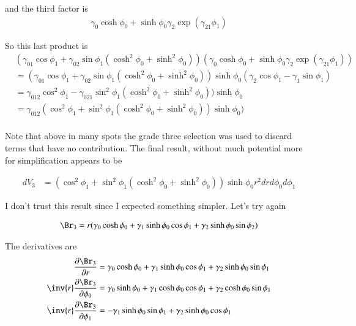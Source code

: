 \documentclass{article}
\begin{document}
and the third factor is
\begin{align*}
\gamma_0 \cosh \phi_0 + \sinh\phi_0 \gamma_{2} \exp( \gamma_{21} \phi_1 ) 
\end{align*}

So this last product is
\begin{align*}
&(\gamma_{01} \cos\phi_1 +\gamma_{02} \sin\phi_1 (\cosh^2 \phi_0 + \sinh^2 \phi_0) )
(\gamma_0 \cosh \phi_0 + \sinh\phi_0 \gamma_{2} \exp( \gamma_{21} \phi_1 ) ) \\
&=
(\gamma_{01} \cos\phi_1 +\gamma_{02} \sin\phi_1 (\cosh^2 \phi_0 + \sinh^2 \phi_0) ) \sinh\phi_0 (\gamma_{2} \cos \phi_1 -\gamma_{1} \sin\phi_1 ) \\
&=
 \gamma_{012} \cos^2\phi_1 
-\gamma_{021} \sin^2\phi_1 (\cosh^2 \phi_0 + \sinh^2 \phi_0) ) \sinh\phi_0  \\
&=
 \gamma_{012} (\cos^2\phi_1 +\sin^2\phi_1 (\cosh^2 \phi_0 + \sinh^2 \phi_0) ) \sinh\phi_0 ) \\
\end{align*}

Note that above in many spots the grade three selection was used to discard terms that have no contribution.  The final result, without much 
potential more for simplification appears to be

\begin{align*}
dV_3 &= (\cos^2\phi_1 +\sin^2\phi_1 (\cosh^2 \phi_0 + \sinh^2 \phi_0) ) \sinh\phi_0 r^2 dr d\phi_0 d\phi_1
\end{align*}

I don't trust this result since I expected something simpler.  Let's try again

\begin{align*}
\Br_3 &= r (\gamma_0 \cosh \phi_0 + \gamma_1 \sinh\phi_0 \cos\phi_1 + \gamma_2 \sinh\phi_0 \sin\phi_2 ) \\
\end{align*}

The derivatives are
\begin{align*}
\PD{r}{\Br_3} &= \gamma_0 \cosh \phi_0 + \gamma_1 \sinh\phi_0 \cos\phi_1 + \gamma_2 \sinh\phi_0 \sin\phi_1  \\
\inv{r} \PD{\phi_0}{\Br_3} &= \gamma_0 \sinh \phi_0 + \gamma_1 \cosh\phi_0 \cos\phi_1 + \gamma_2 \cosh\phi_0 \sin\phi_1  \\
\inv{r} \PD{\phi_1}{\Br_3} &= -\gamma_1 \sinh\phi_0 \sin\phi_1 + \gamma_2 \sinh\phi_0 \cos\phi_1 
\end{align*}



\end{document}
